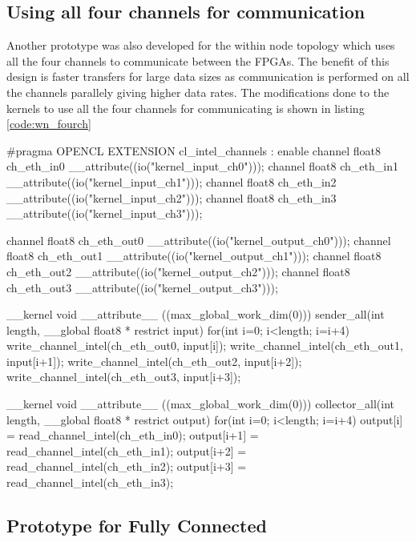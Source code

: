 \subsection*{Using all four channels for communication}

Another prototype was also developed for the within node topology which uses all the four channels
to communicate between the FPGAs. The benefit of this design is faster transfers for large data sizes
as communication is performed on all the channels parallely giving higher data rates. The modifications
done to the kernels to use all the four channels for communicating is shown in listing \ref{code:wn_fourch}

\begin{CppCode}[caption=Kernels for within node using four channels, frame=tlrb, label=code:wn_fourch]
#pragma OPENCL EXTENSION cl_intel_channels : enable
channel float8 ch_eth_in0 __attribute((io("kernel_input_ch0")));
channel float8 ch_eth_in1 __attribute((io("kernel_input_ch1")));
channel float8 ch_eth_in2 __attribute((io("kernel_input_ch2")));
channel float8 ch_eth_in3 __attribute((io("kernel_input_ch3")));

channel float8 ch_eth_out0 __attribute((io("kernel_output_ch0")));
channel float8 ch_eth_out1 __attribute((io("kernel_output_ch1")));
channel float8 ch_eth_out2 __attribute((io("kernel_output_ch2")));
channel float8 ch_eth_out3 __attribute((io("kernel_output_ch3")));

__kernel void __attribute__ ((max_global_work_dim(0)))
sender_all(int length, __global float8 * restrict input)
{
    for(int i=0; i<length; i=i+4)
    {
        write_channel_intel(ch_eth_out0, input[i]);
        write_channel_intel(ch_eth_out1, input[i+1]);
        write_channel_intel(ch_eth_out2, input[i+2]);
        write_channel_intel(ch_eth_out3, input[i+3]);
    }
}

__kernel void __attribute__ ((max_global_work_dim(0)))
collector_all(int length, __global float8 * restrict output)
{
    for(int i=0; i<length; i=i+4)
    {
        output[i] = read_channel_intel(ch_eth_in0);
        output[i+1] = read_channel_intel(ch_eth_in1);
        output[i+2] = read_channel_intel(ch_eth_in2);
        output[i+3] = read_channel_intel(ch_eth_in3);
    }
}
\end{CppCode}

\subsection{Prototype for Fully Connected}

